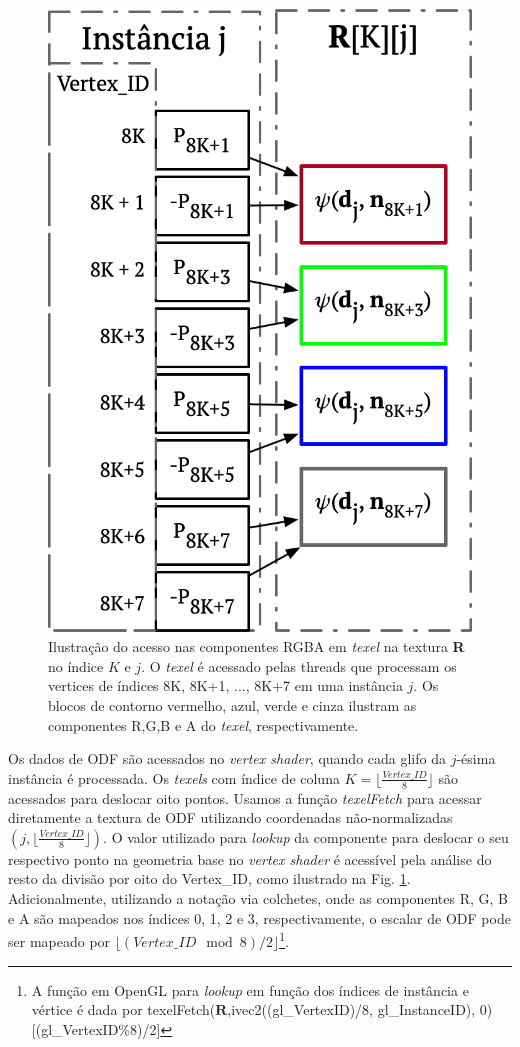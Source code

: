 \documentclass[
    12pt,                %
    oneside,            %
    a4paper,            %
    english,            %
    french,                %
    spanish,            %
    brazil                %
    ]{abntex2}
\begin{document}
\begin{figure}[ht]
    \centering
    \includegraphics[width=.45\linewidth, angle=0]{figs/Esquema_Glifo/texellookup.png}
    \caption{Ilustração do acesso nas componentes RGBA em \textit{texel} na textura \textbf{R} no índice $K$ e $j$. O \textit{texel} é acessado pelas threads que processam os vertices de índices 8K, 8K+1, ..., 8K+7 em uma instância $j$. Os blocos de contorno vermelho, azul, verde e cinza ilustram as componentes R,G,B e A do \textit{texel}, respectivamente.}
    \label{fig::texelfetch}
\end{figure}

Os dados de ODF são acessados no \textit{vertex shader}, quando cada glifo da $j$-ésima instância é processada. Os \textit{texels} com índice de coluna $K = \lfloor\frac{Vertex\_ID}{8} \rfloor$ são acessados para deslocar oito pontos. Usamos a função \textit{texelFetch} para acessar diretamente a textura de ODF utilizando coordenadas não-normalizadas $(j, \lfloor\frac{Vertex\_ID}{8} \rfloor)$. O valor utilizado para \textit{lookup} da componente  para deslocar o seu respectivo ponto na geometria base no \textit{vertex shader} é acessível pela análise do resto da divisão por oito do Vertex\_ID, como ilustrado na Fig. \ref{fig::texelfetch}. Adicionalmente, utilizando a notação via colchetes, onde as componentes R, G, B e A são mapeados nos índices 0, 1, 2 e 3, respectivamente, o escalar de ODF pode ser mapeado por $\lfloor (Vertex\_ID \mod{8})/2 \rfloor$\footnote{A função em OpenGL para \textit{lookup} em função dos índices de instância e vértice é dada por texelFetch($\mathbf{R}$,ivec2((gl\_VertexID)/8, gl\_InstanceID), 0)[(gl\_VertexID\%8)/2]}.
\end{document}

